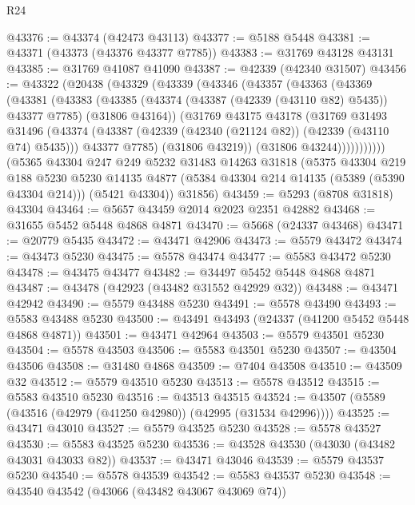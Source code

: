 \begin{lexlean}{R24}
\begin{coremodule}
@43376 := @43374 (@42473 @43113)
@43377 := @5188 @5448
@43381 := @43371 (@43373 (@43376 @43377 @7785))
@43383 := @31769 @43128 @43131
@43385 := @31769 @41087 @41090
@43387 := @42339 (@42340 @31507)
@43456 := @43322
    (@20438
      (@43329
        (@43339
          (@43346
            (@43357
              (@43363
                (@43369
                  (@43381
                    (@43383
                      (@43385
                        (@43374 (@43387 (@42339 (@43110 @82) @5435)) @43377 @7785)
                        (@31806 @43164))
                      (@31769
                        @43175
                        @43178
                        (@31769
                          @31493
                          @31496
                          (@43374
                            (@43387 (@42339 (@42340 (@21124 @82)) (@42339 (@43110 @74) @5435)))
                            @43377
                            @7785)
                          (@31806 @43219))
                        (@31806 @43244)))))))))))
    (@5365
      @43304
      @247
      @249
      @5232
      @31483
      @14263
      @31818
      (@5375
        @43304
        @219
        @188
        @5230
        @5230
        @14135
        @4877
        (@5384 @43304 @214 @14135 (@5389 (@5390 @43304 @214)))
        (@5421 @43304))
      @31856)
@43459 := @5293 (@8708 @31818) @43304
@43464 := @5657 @43459 @2014 @2023 @2351 @42882
@43468 := @31655 @5452 @5448 @4868 @4871
@43470 := @5668 (@24337 @43468)
@43471 := @20779 @5435
@43472 := @43471 @42906
@43473 := @5579 @43472
@43474 := @43473 @5230
@43475 := @5578 @43474
@43477 := @5583 @43472 @5230
@43478 := @43475 @43477
@43482 := @34497 @5452 @5448 @4868 @4871
@43487 := @43478 (@42923 (@43482 @31552 @42929 @32))
@43488 := @43471 @42942
@43490 := @5579 @43488 @5230
@43491 := @5578 @43490
@43493 := @5583 @43488 @5230
@43500 := @43491 @43493 (@24337 (@41200 @5452 @5448 @4868 @4871))
@43501 := @43471 @42964
@43503 := @5579 @43501 @5230
@43504 := @5578 @43503
@43506 := @5583 @43501 @5230
@43507 := @43504 @43506
@43508 := @31480 @4868
@43509 := @7404 @43508
@43510 := @43509 @32
@43512 := @5579 @43510 @5230
@43513 := @5578 @43512
@43515 := @5583 @43510 @5230
@43516 := @43513 @43515
@43524 := @43507 (@5589 (@43516 (@42979 (@41250 @42980)) (@42995 (@31534 @42996))))
@43525 := @43471 @43010
@43527 := @5579 @43525 @5230
@43528 := @5578 @43527
@43530 := @5583 @43525 @5230
@43536 := @43528 @43530 (@43030 (@43482 @43031 @43033 @82))
@43537 := @43471 @43046
@43539 := @5579 @43537 @5230
@43540 := @5578 @43539
@43542 := @5583 @43537 @5230
@43548 := @43540 @43542 (@43066 (@43482 @43067 @43069 @74))

\end{coremodule}
\end{lexlean}

